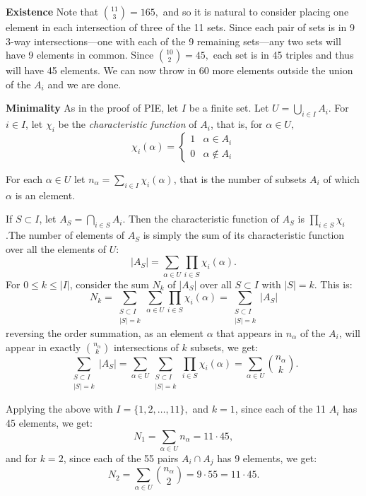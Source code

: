 \begin{enumerate}
\textbf{Existence} Note that $\textstyle \binom{11}3 = 165,$ and so it is natural to consider placing one element in each intersection of three of the 11 sets. Since each pair of sets is in 9 3-way intersections—one with each of the 9 remaining sets—any two sets will have 9 elements in common. Since $\textstyle \binom{10}2 = 45,$ each set is in 45 triples and thus will have 45 elements. We can now throw in 60 more elements outside the union of the $A_i$ and we are done.

 \textbf{Minimality} As in the proof of PIE, let $I$ be a finite set. Let $\textstyle U = \bigcup_{i\in I} A_i$. For $i\in I$, let $\chi_i$ be the \textit{characteristic function} of $A_i$, that is, for $\alpha \in U,$
 \[\chi_i(\alpha) = \begin{cases} 1 & \alpha \in A_i \\ 0 & \alpha \not\in A_i \end{cases}\]

 For each $\alpha \in U$ let $\textstyle n_\alpha = \sum_{i \in I} \chi_i(\alpha)$, that is the number of subsets $A_i$ of which $\alpha$ is an element.

 If $S \subset I$, let $\textstyle A_S = \bigcap_{i \in S}A_i$. Then the characteristic function of $A_S$ is $\textstyle \prod_{i \in S} \chi_i$.The number of elements of $A_S$ is simply the sum of its characteristic function over all the elements of $U$:
 \[|A_S| = \sum_{\alpha \in U} \prod_{i \in S} \chi_i(\alpha).\]For $0 \le k \le |I|$, consider the sum $N_k$ of $|A_S|$ over all $S\subset I$ with $|S|= k$. This is:
 \[N_k = \sum_{\substack{S\subset I\\|S| = k}} \sum_{\alpha \in U} \prod_{i \in S} \chi_i(\alpha) = \sum_{\substack{S\subset I\\|S| = k}} |A_S|\]reversing the order summation, as an element $\alpha$ that appears in $n_\alpha$ of the $A_i$, will appear in exactly $\textstyle \binom{n_\alpha}{k}$ intersections of $k$ subsets, we get:
 \[\sum_{\substack{S\subset I\\|S| = k}} |A_S| = \sum_{\alpha \in U} \sum_{\substack{S\subset I\\|S| = k}} \prod_{i \in S} \chi_i(\alpha) = \sum_{\alpha \in U} \binom{n_\alpha}k.\]

 Applying the above with $I = \{1, 2, \ldots, 11\},$ and $k=1$, since each of the 11 $A_i$ has 45 elements, we get:
 \[N_1 = \sum_{\alpha \in U} n_\alpha = 11 \cdot 45,\]and for $k = 2$, since each of the 55 pairs $A_i \cap A_j$ has 9 elements, we get:
 \[N_2 = \sum_{\alpha \in U} \binom{n_\alpha}2 = 9 \cdot 55 = 11 \cdot 45.\]


\end{enumerate}
